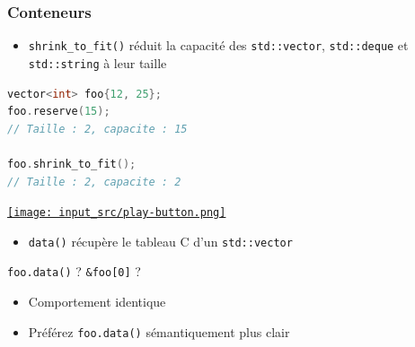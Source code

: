 \documentclass[C++.tex]{subfiles}
\begin{document}
\begin{frame}[fragile]
	\frametitle{Conteneurs}
	\begin{itemize}
		\item \lstinline|shrink_to_fit()| réduit la capacité des \lstinline|std::vector|, \lstinline|std::deque| et \lstinline|std::string| à leur taille
	\end{itemize}


	\begin{lstlisting}[language=C++]
vector<int> foo{12, 25};
foo.reserve(15);
// Taille : 2, capacite : 15

foo.shrink_to_fit();
// Taille : 2, capacite : 2\end{lstlisting}

	\hfill
	\href{https://godbolt.org/#g:!((g:!((g:!((h:codeEditor,i:(filename:'1',fontScale:14,fontUsePx:'0',j:1,lang:c%2B%2B,selection:(endColumn:1,endLineNumber:13,positionColumn:1,positionLineNumber:13,selectionStartColumn:1,selectionStartLineNumber:13,startColumn:1,startLineNumber:13),source:'%23include+%3Ciostream%3E%0A%23include+%3Cvector%3E%0A%0Aint+main()%0A%7B%0A++std::vector%3Cint%3E+foo%7B12,+25%7D%3B%0A++foo.reserve(15)%3B%0A++std::cout+%3C%3C+foo.size()+%3C%3C+%22+/+%22+%3C%3C+foo.capacity()+%3C%3C+!'%5Cn!'%3B%0A%0A++foo.shrink_to_fit()%3B%0A++std::cout+%3C%3C+foo.size()+%3C%3C+%22+/+%22+%3C%3C+foo.capacity()+%3C%3C+!'%5Cn!'%3B%0A%7D%0A'),l:'5',n:'0',o:'C%2B%2B+source+%231',t:'0')),k:50,l:'4',n:'0',o:'',s:0,t:'0'),(g:!((h:executor,i:(argsPanelShown:'1',compilationPanelShown:'0',compiler:g112,compilerOutShown:'0',execArgs:'',execStdin:'',fontScale:14,fontUsePx:'0',j:1,lang:c%2B%2B,libs:!((name:boost,ver:'175')),options:'-std%3Dc%2B%2B11',source:1,stdinPanelShown:'1',tree:'1',wrap:'0'),l:'5',n:'0',o:'Executor+x86-64+gcc+11.2+(C%2B%2B,+Editor+%231)',t:'0')),header:(),k:50,l:'4',n:'0',o:'',s:0,t:'0')),l:'2',n:'0',o:'',t:'0')),version:4}{\texttt{[image: input\_src/play-button.png]}}

	\begin{itemize}
		\item \lstinline|data()| récupère le \og tableau C\fg{} d'un \lstinline|std::vector|
	\end{itemize}

	\begin{block}{\lstinline|foo.data()| ? \lstinline|&foo[0]| ?}
		\begin{itemize}
			\item Comportement identique
			\item Préférez \lstinline|foo.data()| sémantiquement plus clair
		\end{itemize}
	\end{block}
\end{frame}
\end{document}
